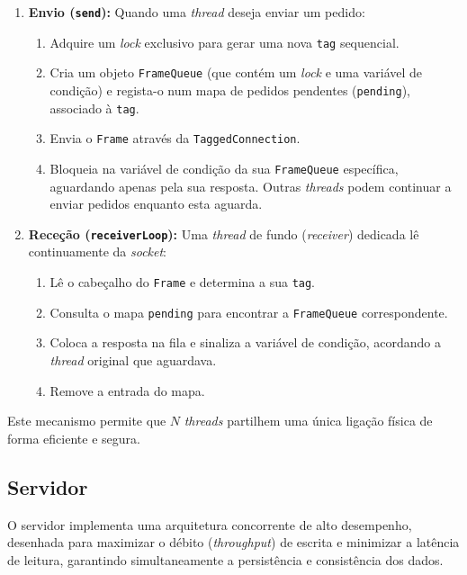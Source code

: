 \documentclass{article}
\begin{document}
\begin{enumerate}
    \item \textbf{Envio (\texttt{send}):} Quando uma \textit{thread} deseja enviar um pedido:
    \begin{enumerate}
        \item Adquire um \textit{lock} exclusivo para gerar uma nova \texttt{tag} sequencial.
        \item Cria um objeto \texttt{FrameQueue} (que contém um \textit{lock} e uma variável de condição) e regista-o num mapa de pedidos pendentes (\texttt{pending}), associado à \texttt{tag}.
        \item Envia o \texttt{Frame} através da \texttt{TaggedConnection}.
        \item Bloqueia na variável de condição da sua \texttt{FrameQueue} específica, aguardando apenas pela sua resposta. Outras \textit{threads} podem continuar a enviar pedidos enquanto esta aguarda.
    \end{enumerate}

    \item \textbf{Receção (\texttt{receiverLoop}):} Uma \textit{thread} de fundo (\textit{receiver}) dedicada lê continuamente da \textit{socket}:
    \begin{enumerate}
        \item Lê o cabeçalho do \texttt{Frame} e determina a sua \texttt{tag}.
        \item Consulta o mapa \texttt{pending} para encontrar a \texttt{FrameQueue} correspondente.
        \item Coloca a resposta na fila e sinaliza a variável de condição, acordando a \textit{thread} original que aguardava.
        \item Remove a entrada do mapa.
    \end{enumerate}
\end{enumerate}

Este mecanismo permite que $N$ \textit{threads} partilhem uma única ligação física de forma eficiente e segura.

\subsection{Servidor}

O servidor implementa uma arquitetura concorrente de alto desempenho, desenhada para maximizar o débito (\textit{throughput}) de escrita e minimizar a latência de leitura, garantindo simultaneamente a persistência e consistência dos dados.
\end{document}
